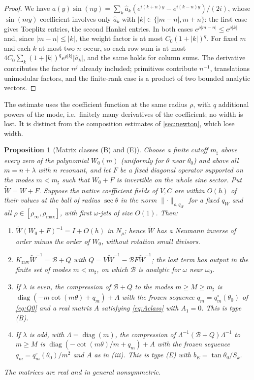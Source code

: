\documentclass[11pt]{amsart}
\numberwithin{equation}{section}
\newtheorem{proposition}[theorem]{Proposition}
\theoremstyle{definition}
\theoremstyle{remark}
\newcommand{\abs}[1]{\lvert #1\rvert}
\newcommand{\norm}[1]{\lVert #1\rVert}
\newcommand{\cB}{\mathcal B}
\begin{document}
\begin{proof}
We have $a(y)\sin(ny)=\sum_k\hat a_k(e^{i(k+n)y}-e^{i(k-n)y})/(2i)$, whose $\sin(my)$ coefficient involves only $\hat a_k$ with $\abs k\in\{\abs{m-n},m+n\}$: the first case gives Toeplitz entries, the second Hankel entries. In both cases $e^{\rho\abs{m-n}}\le e^{\rho\abs k}$ and, since $\abs{m-n}\le\abs k$, the weight factor is at most $C_0(1+\abs k)^q$. For fixed $m$ and each $k$ at most two $n$ occur, so each row sum is at most $4C_0\sum_k(1+\abs k)^qe^{\rho\abs k}\abs{\hat a_k}$, and the same holds for column sums. The derivative contributes the factor $n^j$ already included; primitives contribute $n^{-1}$, translations unimodular factors, and the finite-rank case is a product of two bounded analytic vectors.
\end{proof}

The estimate uses the coefficient function at the same radius $\rho$, with $q$ additional powers of the mode, i.e.\ finitely many derivatives of the coefficient; no width is lost. It is distinct from the composition estimates of \cref{sec:newton}, which lose width.

\begin{proposition}[Matrix classes (B) and (E)]\label{prop:evenclass}
Choose a finite cutoff $m_\sharp$ above every zero of the polynomial $W_0(m)$ (uniformly for $\theta$ near $\theta_0$) and above all $m=n+\lambda$ with $n$ resonant, and let $F$ be a fixed diagonal operator supported on the modes $m<m_\sharp$ such that $W_0+F$ is invertible on the whole sine sector. Put $\widetilde W=W+F$. Suppose the native coefficient fields of $V,C$ are within $O(h)$ of their values at the ball of radius $\sec\theta$ in the norm $\norm\cdot_{\rho,q_W}$ for a fixed $q_W$ and all $\rho\in[\rho_\infty,\rho_{\max}]$, with first $\omega$-jets of size $O(1)$. Then:
\begin{enumerate}[label=\textup{(\roman*)}]
\item $\widetilde W(W_0+F)^{-1}=I+O(h)$ in $N_\rho$; hence $\widetilde W$ has a Neumann inverse of order minus the order of $W_0$, without rotation small divisors.
\item $K_{\mathrm{raw}}\widetilde W^{-1}=\cB+Q$ with $Q=V\widetilde W^{-1}-\cB F\widetilde W^{-1}$; the last term has output in the finite set of modes $m<m_\sharp$, on which $\cB$ is analytic for $\omega$ near $\omega_0$.
\item If $\lambda$ is even, the compression of $\cB+Q$ to the modes $m\ge M\ge m_\sharp$ is $\operatorname{diag}(-m\cot(m\theta)+q_m)+A$ with the frozen sequence $q_m=q^\circ_m(\theta_0)$ of \eqref{eq:Q0} and a real matrix $A$ satisfying \eqref{eq:Aclass} with $A_1=0$. This is type \textup{(B)}.
\item If $\lambda$ is odd, with $\Lambda=\operatorname{diag}(m)$, the compression of $\Lambda^{-1}(\cB+Q)\Lambda^{-1}$ to $m\ge M$ is $\operatorname{diag}(-\cot(m\theta)/m+q_m)+A$ with the frozen sequence $q_m=q^\circ_m(\theta_0)/m^2$ and $A$ as in \textup{(iii)}. This is type \textup{(E)} with $b_E=\tan\theta_0/S_k$.
\end{enumerate}
The matrices are real and in general nonsymmetric.
\end{proposition}
\end{document}
